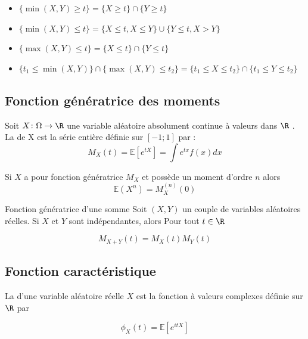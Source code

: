 		\begin{itemize}
			\item $\{\min(X,Y) \geq t\} = \{X \geq t\} \cap \{Y \geq t\}$
			\item $\{\min(X,Y) \leq t\} = \{X \leq t,X \leq Y\} \cup \{Y \leq t,X>Y\}$
			\item $\{\max(X,Y) \leq t\} = \{X \leq t\} \cap \{Y \leq t\}$
			\item $\{t_1 \leq \min(X,Y) \} \cap \{\max(X,Y) \leq t_2\} = \{t_1 \leq X \leq t_2\} \cap \{t_1 \leq Y \leq t_2\}$
		\end{itemize}
		

		
		\subsection{Fonction génératrice des moments}
		
		\begin{definition}{}{}
			Soit $X \colon \Omega \to \R $ une variable aléatoire absolument continue à valeurs dans $\R$ .  La  de X est la série entière définie sur $[-1;1]$ par :
			$$M_X(t)=\mathbb{E}[e^{tX}] =\int e^{tx}f(x)dx$$
			
		\end{definition}
		

		
		\begin{proposition}{}{}
			Si $X$ a pour fonction génératrice $M_X$ et possède un moment d'ordre $n$ alors 
			$$\mathbb{E}(X^n) = M_X^{(n)}(0)$$
		\end{proposition}
		
				\begin{proposition}{Fonction génératrice d'une somme}{}
					Soit  $(X,Y)$ un couple de variables aléatoires réelles. Si $X$ et $Y$ sont indépendantes, alors Pour tout $t \in \R $
					
					$$ M_{X+Y}(t)=M_X(t)M_Y(t)$$

					
				\end{proposition}
		\subsection{Fonction caractéristique}
		
		\begin{definition}{}{}
			La  d'une variable aléatoire réelle $X$ est la fonction à valeurs complexes définie sur $\R$ par
			
			$$\phi_{X}(t) =\mathbb{E}\left[e^{i tX}\right]$$
		\end{definition}
	
